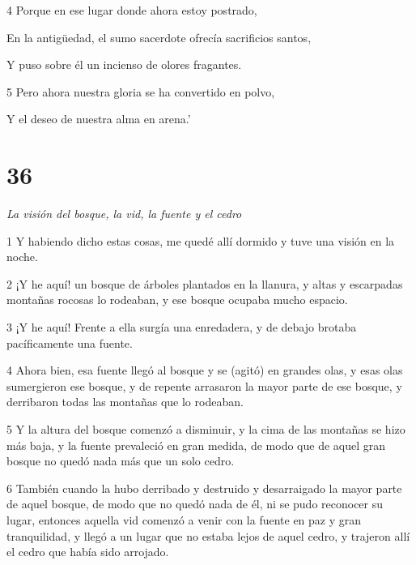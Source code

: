 \par 4 Porque en ese lugar donde ahora estoy postrado,

\par En la antigüedad, el sumo sacerdote ofrecía sacrificios santos,

\par Y puso sobre él un incienso de olores fragantes.

\par 5 Pero ahora nuestra gloria se ha convertido en polvo,

\par Y el deseo de nuestra alma en arena.'

\chapter{36}

\par \textit{La visión del bosque, la vid, la fuente y el cedro}

\par 1 Y habiendo dicho estas cosas, me quedé allí dormido y tuve una visión en la noche.

\par 2 ¡Y he aquí! un bosque de árboles plantados en la llanura, y altas y escarpadas montañas rocosas lo rodeaban, y ese bosque ocupaba mucho espacio.

\par 3 ¡Y he aquí! Frente a ella surgía una enredadera, y de debajo brotaba pacíficamente una fuente.

\par 4 Ahora bien, esa fuente llegó al bosque y se (agitó) en grandes olas, y esas olas sumergieron ese bosque, y de repente arrasaron la mayor parte de ese bosque, y derribaron todas las montañas que lo rodeaban.

\par 5 Y la altura del bosque comenzó a disminuir, y la cima de las montañas se hizo más baja, y la fuente prevaleció en gran medida, de modo que de aquel gran bosque no quedó nada más que un solo cedro.

\par 6 También cuando la hubo derribado y destruido y desarraigado la mayor parte de aquel bosque, de modo que no quedó nada de él, ni se pudo reconocer su lugar, entonces aquella vid comenzó a venir con la fuente en paz y gran tranquilidad, y llegó a un lugar que no estaba lejos de aquel cedro, y trajeron allí el cedro que había sido arrojado.

